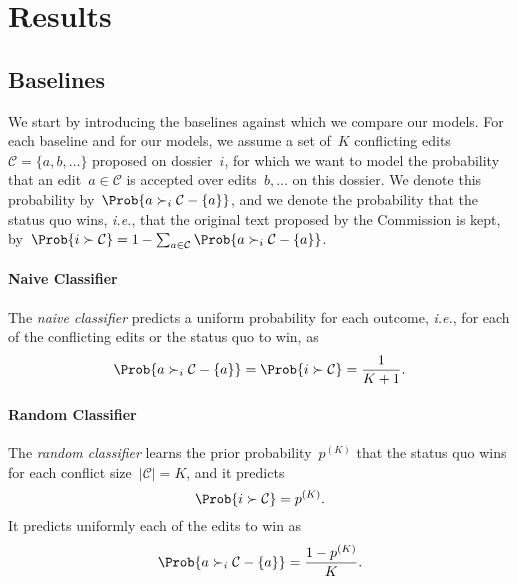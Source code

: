 \section{Results}
\label{lmp:sec:results}

\subsection{Baselines}

We start by introducing the baselines against which we compare our models.
For each baseline and for our models, we assume a set of~$K$ conflicting edits \mbox{$\mathcal{C} = \{ a, b, \ldots \}$} proposed on dossier~$i$, for which we want to model the probability that an edit~$a \in \mathcal{C}$ is accepted over edits~$b, \ldots$ on this dossier.
We denote this probability by~$\Prob{ a \succ_i \mathcal{C} - \{ a\} }$, and we denote the probability that the status quo wins, \textit{i.e.}, that the original text proposed by the Commission is kept, by~$\Prob{ i \succ \mathcal{C} } = 1 - \sum_{a\in \mathcal{C}} \Prob{ a \succ_i \mathcal{C} - \{a\} }$.

\paragraph{Naive Classifier}

The \textit{naive classifier} predicts a uniform probability for each outcome, \textit{i.e.}, for each of the conflicting edits or the status quo to win, as
\begin{equation*}
	\Prob{ a \succ_i \mathcal{C} - \{ a\} } = \Prob{ i \succ \mathcal{C} } = \frac{1}{K + 1}.
\end{equation*}

\paragraph{Random Classifier}

The \textit{random classifier} learns the prior probability~$p^{(K)}$ that the status quo wins for each conflict size~$\vert \mathcal{C} \vert = K$, and it predicts
\begin{equation*}
	\Prob{ i \succ \mathcal{C} } = p^{(K)}.
\end{equation*}
It predicts uniformly each of the edits to win as
\begin{equation*}
	\Prob{ a \succ_i \mathcal{C} - \{ a\} } = \frac{1-p^{(K)}}{K}.
\end{equation*}

